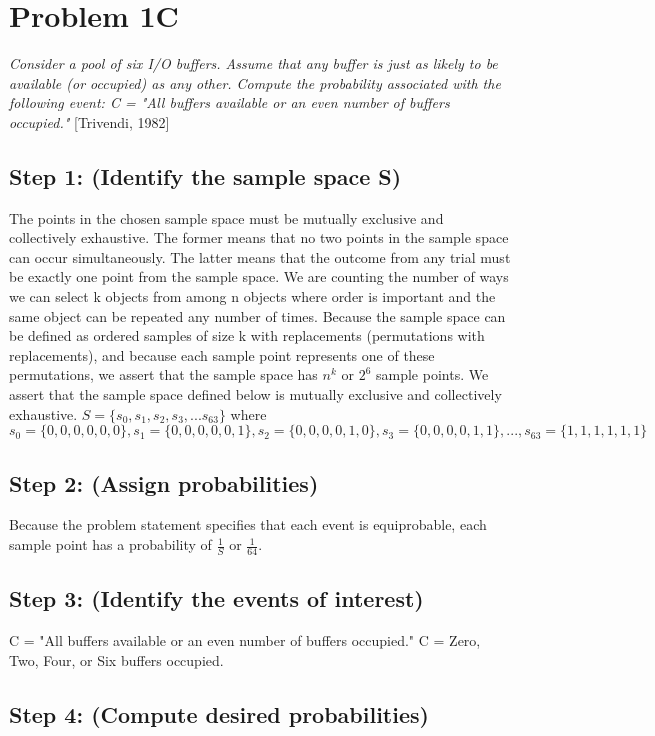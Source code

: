 \documentclass[a4paper,10pt]{article}
\title{}
\author{Mark Johnson \\
Loyola University Chicago}
\date {mjohnson4@luc.edu}
\begin{document}
\maketitle

\section{Problem 1C}
\emph{Consider a pool of six I/O buffers. Assume that any buffer is just as likely to be available (or occupied) as 
any other. Compute the probability associated with the following event: \newline
C = "All buffers available or an even number of buffers occupied."} [Trivendi, 1982]
\subsection{Step 1: (Identify the sample space S)}
The points in the chosen sample space must be mutually exclusive and collectively exhaustive. The former means that 
no two points in the sample space can occur simultaneously. The latter means that the outcome from any trial must be 
exactly one point from the sample space. We are counting the number of ways we can select k objects from among n 
objects where order is important and the same object can be repeated any number of times. Because the sample space 
can be defined as ordered samples of size k with replacements (permutations with replacements), and because each 
sample point represents one of these permutations, we assert that the sample space has $ n^{k} $ or $ 2^{6} $ sample 
points. We assert that the sample space defined below is mutually exclusive and collectively exhaustive. \newline
$ S = \{ s_{0}, s_{1}, s_{2}, s_{3},...s_{63} \} $ where \newline
$ s_{0} = \{0,0,0,0,0,0\}, s_{1} = \{0,0,0,0,0,1\}, s_{2} = \{0,0,0,0,1,0\}, s_{3} = \{0,0,0,0,1,1\},...,s_{63} = 
\{1,1,1,1,1,1\} $

\subsection{Step 2: (Assign probabilities)}
Because the problem statement specifies that each event is equiprobable, each sample point has a probability of $ 
\frac{1}{S} $ or $ \frac{1}{64} $.

\subsection{Step 3: (Identify the events of interest)}
C = "All buffers available or an even number of buffers occupied." \newline
C = Zero, Two, Four, or Six buffers occupied. \newline


\subsection{Step 4: (Compute desired probabilities)}
\end{document}
